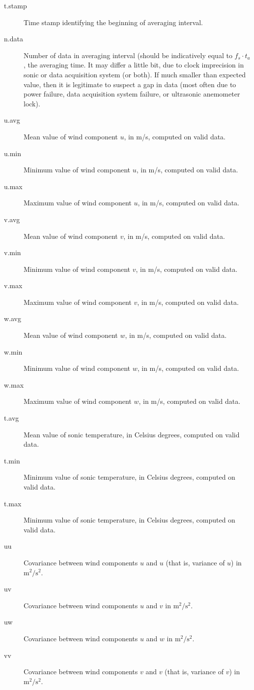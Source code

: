\documentclass[a4paper,10pt]{book}
\begin{document}
\begin{description}
 \item[t.stamp] Time stamp identifying the beginning of averaging interval.
 \item[n.data] Number of data in averaging interval (should be indicatively equal to $f_{s} \cdot t_{a}$, the averaging time. It may differ a little bit, due to clock imprecision in sonic or data acquisition system (or both). If much smaller than expected value, then it is legitimate to suspect a gap in data (most often due to power failure, data acquisition system failure, or ultrasonic anemometer lock).
 \item[u.avg] Mean value of wind component $u$, in m/s, computed on valid data.
 \item[u.min] Minimum value of wind component $u$, in m/s, computed on valid data.
 \item[u.max] Maximum value of wind component $u$, in m/s, computed on valid data.
 \item[v.avg] Mean value of wind component $v$, in m/s, computed on valid data.
 \item[v.min] Minimum value of wind component $v$, in m/s, computed on valid data.
 \item[v.max] Maximum value of wind component $v$, in m/s, computed on valid data.
 \item[w.avg] Mean value of wind component $w$, in m/s, computed on valid data.
 \item[w.min] Minimum value of wind component $w$, in m/s, computed on valid data.
 \item[w.max] Maximum value of wind component $w$, in m/s, computed on valid data.
 \item[t.avg] Mean value of sonic temperature, in Celsius degrees, computed on valid data.
 \item[t.min] Minimum value of sonic temperature, in Celsius degrees, computed on valid data.
 \item[t.max] Minimum value of sonic temperature, in Celsius degrees, computed on valid data.
 \item[uu] Covariance between wind components $u$ and $u$ (that is, variance of $u$) in $\mbox{m}^2/\mbox{s}^2$.
 \item[uv] Covariance between wind components $u$ and $v$ in $\mbox{m}^2/\mbox{s}^2$.
 \item[uw] Covariance between wind components $u$ and $w$ in $\mbox{m}^2/\mbox{s}^2$.
 \item[vv] Covariance between wind components $v$ and $v$ (that is, variance of $v$) in $\mbox{m}^2/\mbox{s}^2$.

\end{description}
\end{document}
